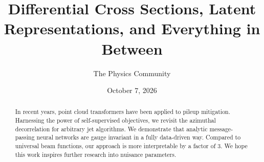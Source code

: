 \documentclass[11pt]{article}
\title{Differential Cross Sections, Latent Representations, and Everything in Between}
\author{The Physics Community}
\date{October 7, 2026}
\numberwithin{equation}{section}
\theoremstyle{definition}
\theoremstyle{remark}
\begin{document}
\maketitle
\begin{abstract}
In recent years, point cloud transformers have been applied to pileup
mitigation. Harnessing the power of self-supervised objectives, we
revisit the azimuthal decorrelation for arbitrary jet algorithms. We
demonstrate that analytic message-passing neural networks are gauge
invariant in a fully data-driven way. Compared to universal beam
functions, our approach is more interpretable by a factor of 3. We hope
this work inspires further research into nuisance parameters.
\end{abstract}
\tableofcontents




\nocite{*}


\end{document}

